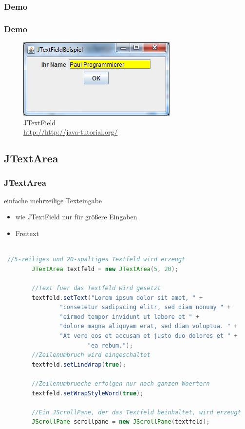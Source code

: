 \documentclass[xcolor=dvipsnames]{beamer}
\begin{document}
\subsubsection{Demo}
\begin{frame}
  \frametitle{Demo}
	\begin{figure}
		\includegraphics[scale=0.8]{images/jtextfield.PNG}
		\caption{JTextField \\ \tiny{\textcolor{gray}{\url{http://http://java-tutorial.org/}}}}
		\end{figure}
\end{frame}

\subsection{JTextArea}
\begin{frame}  %
  \frametitle{JTextArea
} %
  \begin{block}{einfache mehrzeilige Texteingabe}
	  \begin{itemize}
		\item wie JTextField nur für größere Eingaben
		\item Freitext
	  \end{itemize}
  \end{block}

\begin{lstlisting}[language=java,basicstyle=\scriptsize\ttfamily]

 //5-zeiliges und 20-spaltiges Textfeld wird erzeugt
        JTextArea textfeld = new JTextArea(5, 20);
 
        //Text fuer das Textfeld wird gesetzt
        textfeld.setText("Lorem ipsum dolor sit amet, " +
        		"consetetur sadipscing elitr, sed diam nonumy " +
        		"eirmod tempor invidunt ut labore et " +
        		"dolore magna aliquyam erat, sed diam voluptua. " +
        		"At vero eos et accusam et justo duo dolores et " +
                        "ea rebum.");
        //Zeilenumbruch wird eingeschaltet
        textfeld.setLineWrap(true);
 
        //Zeilenumbrueche erfolgen nur nach ganzen Woertern
        textfeld.setWrapStyleWord(true);
 
        //Ein JScrollPane, der das Textfeld beinhaltet, wird erzeugt
        JScrollPane scrollpane = new JScrollPane(textfeld); 

\end{lstlisting}

\end{frame}
\end{document}
